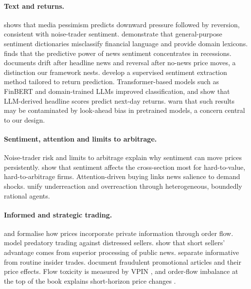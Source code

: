 \documentclass[11pt,a4paper]{article}
\theoremstyle{plain}
\theoremstyle{definition}
\theoremstyle{remark}
\begin{document}
\paragraph{Text and returns.} \citet{tetlock2007} shows that media pessimism predicts downward pressure followed by reversion, consistent with noise-trader sentiment. \citet{loughran2011} demonstrate that general-purpose sentiment dictionaries misclassify financial language and provide domain lexicons. \citet{garcia2013} finds that the predictive power of news sentiment concentrates in recessions. \citet{chan2003} documents drift after headline news and reversal after no-news price moves, a distinction our framework nests. \citet{ke2019} develop a supervised sentiment extraction method tailored to return prediction. Transformer-based models such as FinBERT \citep{araci2019} and domain-trained LLMs \citep{wu2023bloomberggpt} improved classification, and \citet{lopezlira2023} show that LLM-derived headline scores predict next-day returns. \citet{glasserman2023} warn that such results may be contaminated by look-ahead bias in pretrained models, a concern central to our design.

\paragraph{Sentiment, attention and limits to arbitrage.} Noise-trader risk \citep{delong1990} and limits to arbitrage \citep{shleifer1997} explain why sentiment can move prices persistently. \citet{baker2006} show that sentiment affects the cross-section most for hard-to-value, hard-to-arbitrage firms. Attention-driven buying \citep{barber2008,da2011} links news salience to demand shocks. \citet{hong1999} unify underreaction and overreaction through heterogeneous, boundedly rational agents.

\paragraph{Informed and strategic trading.} \citet{kyle1985} and \citet{glosten1985} formalise how prices incorporate private information through order flow. \citet{brunnermeier2005} model predatory trading against distressed sellers. \citet{engelberg2012} show that short sellers' advantage comes from superior processing of public news. \citet{cohen2012} separate informative from routine insider trades. \citet{kogan2023} document fraudulent promotional articles and their price effects. Flow toxicity is measured by VPIN \citep{easley2012}, and order-flow imbalance at the top of the book explains short-horizon price changes \citep{cont2014}.
\end{document}
